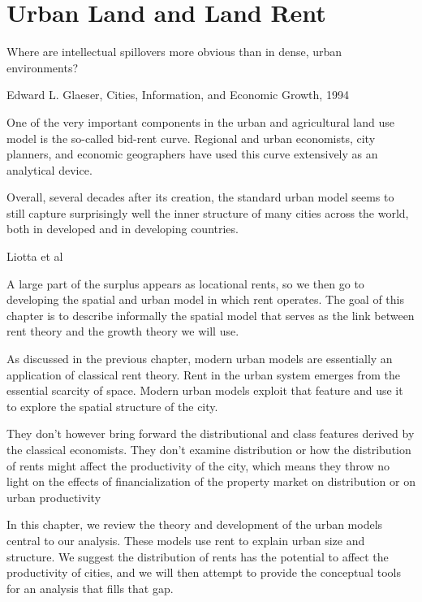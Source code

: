 \chapter{Urban Land and Land Rent} \label{chapter-space}
\epigraph{Where are intellectual spillovers more obvious than in dense, urban environments?}{Edward L. Glaeser,\cite{glaeserCitiesInformationEconomic1994} Cities, Information, and Economic Growth, 1994}
\epigraph{One of the very important components in the urban and agricultural land use model is the so-called \gls{bid-rent curve}. Regional and urban economists, city planners, and economic geographers have used this curve extensively as an analytical device.}{\cite{shiehWilhelmLaunhardtBidRent2004}}
\epigraph{Overall, several decades after its creation, the standard urban model seems to still capture surprisingly well the inner structure of many cities across the world, both in developed and in developing countries.}{Liotta et al \cite{liottaTestingMonocentricStandard2022}}

A large part of the surplus appears as locational rents, so we then go to developing the spatial and urban model in which rent operates.  
The goal of this chapter is to describe informally the spatial model that serves as the link between rent theory and the growth theory we will use. 

As discussed in the previous chapter, modern urban models are essentially an application of classical rent theory. Rent in the urban system emerges from the essential scarcity of space. Modern urban models exploit that feature and use it to explore the spatial structure of the city.

They don't however bring forward the distributional and class features derived by the classical economists.  They don't examine distribution or how the distribution of rents might affect the productivity of the city, which means they throw no light on the effects of financialization of the property market on distribution or on urban productivity

In this chapter, we review the theory and development of the urban models central to our analysis. These models use rent to explain urban size and structure. 
We suggest the distribution of rents has the potential to affect the productivity of cities, and we will then attempt to provide the conceptual tools for an analysis that fills that gap.



